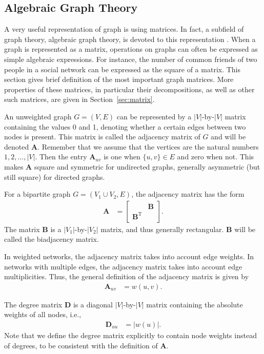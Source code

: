 \documentclass{article}
\begin{document}
\subsection{Algebraic Graph Theory}
A very useful representation of graph is using matrices. In fact, a
subfield of graph theory, algebraic graph theory, is devoted to
this representation \citep{b118}.  When a graph is represented as a
matrix, operations on graphs can often be expressed as simple algebraic
expressions.  For instance, the number of common friends of
two people in a social network can be expressed as the square of a
matrix. 
This section gives brief definition of the most important graph
matrices.  More properties of these matrices, in particular their
decompositions, as well as other such 
matrices, are given in Section~\ref{sec:matrix}. 

An unweighted graph $G=(V,E)$ can be represented by a $|V|$-by-$|V|$
matrix containing the values 0 and 1, denoting whether a certain edges
between two nodes is present.  This matrix is called the adjacency
matrix of $G$ and will be denoted $\mathbf A$.  Remember that we assume
that the vertices are the natural numbers $1, 2, \dotsc, |V|$.  Then the
entry $\mathbf A_{uv}$ is one when $\{u,v\} \in E$ and zero when not.
This makes $\mathbf A$ square and symmetric for undirected graphs, generally
asymmetric (but still square) for directed graphs.  

For a bipartite graph $G=(V_1 \cup V_2, E)$, the adjacency matrix has
the form 
\begin{align}
  \mathbf A &= \left[ \begin{array}{cc} & \mathbf B \\
      \mathbf B^{\mathrm T} & \end{array} \right].
\end{align}
The matrix $\mathbf B$ is a $|V_1|$-by-$|V_2|$ matrix, and thus
generally rectangular. $\mathbf B$ will be called the biadjacency
matrix. 

In weighted networks, the adjacency matrix takes into account edge
weights.  In networks with multiple edges, the adjacency matrix takes
into account edge multiplicities. Thus, the general definition of the
adjacency matrix is given by
\begin{align}
  \mathbf A_{uv} &= w(u, v). 
\end{align}

The degree matrix $\mathbf D$ is a diagonal $|V|$-by-$|V|$ matrix containing
the absolute weights of all nodes, i.e.,
\begin{align}
  \mathbf D_{uu} &= |w(u)|. 
\end{align}
Note that we define the degree matrix explicitly to contain node weights
instead of degrees, to be consistent with the definition of $\mathbf
A$. 
\end{document}
